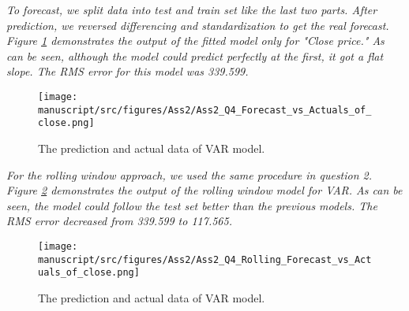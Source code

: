 \textit{To forecast, we split data into test and train set like the last two parts. After prediction, we reversed differencing and standardization to get the real forecast. Figure \ref{fig:Ass2_Q4_Forecast_vs_Actuals_of_close} demonstrates the output of the fitted model only for "Close price." As can be seen, although the model could predict perfectly at the first, it got a flat slope. The RMS error for this model was 339.599.} 


\begin{figure}[H]
    \centering
    \begin{minipage}[b]{1\textwidth}
        \texttt{[image: manuscript/src/figures/Ass2/Ass2\_Q4\_Forecast\_vs\_Actuals\_of\_close.png]}
    \end{minipage}
    \caption{The prediction and actual data of VAR model.}
    \label{fig:Ass2_Q4_Forecast_vs_Actuals_of_close}
\end{figure}




\textit{For the rolling window approach, we used the same procedure in question 2. Figure \ref{fig:Ass2_Q4_Rolling_Forecast_vs_Actuals_of_close} demonstrates the output of the rolling window model for VAR. As can be seen, the model could follow the test set better than the previous models. The RMS error decreased from 339.599 to 117.565.}


\begin{figure}[H]
    \centering
    \begin{minipage}[b]{1\textwidth}
        \texttt{[image: manuscript/src/figures/Ass2/Ass2\_Q4\_Rolling\_Forecast\_vs\_Actuals\_of\_close.png]}
    \end{minipage}
    \caption{The prediction and actual data of VAR model.}
    \label{fig:Ass2_Q4_Rolling_Forecast_vs_Actuals_of_close}
\end{figure}